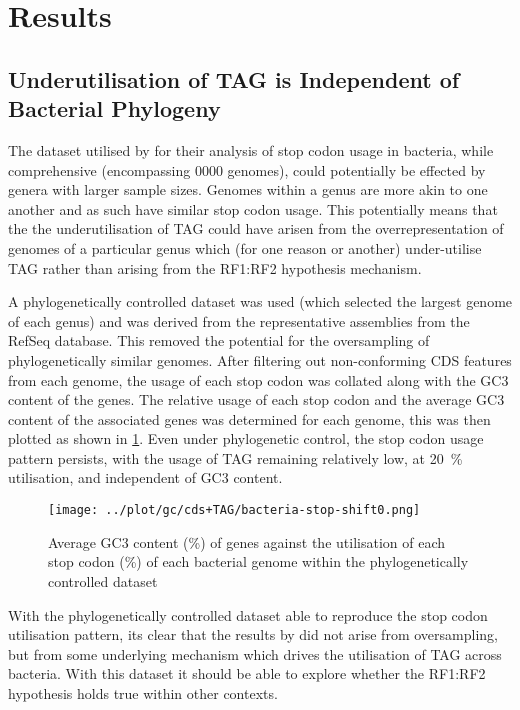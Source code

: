 \documentclass[../main.tex]{subfile}
\begin{document}
 \section{Results}
    \subsection{Underutilisation of TAG is Independent of Bacterial Phylogeny}
        The dataset utilised by \autocite{PLACEHOLDER} for their analysis of stop codon usage in bacteria, while comprehensive (encompassing \num{0000} genomes), could potentially be effected by genera with larger sample sizes. Genomes within a genus are more akin to one another and as such have similar stop codon usage. This potentially means that the the underutilisation of TAG could have arisen from the overrepresentation of genomes of a particular genus which (for one reason or another) under-utilise TAG rather than arising from the RF1:RF2 hypothesis mechanism.

        A phylogenetically controlled dataset was used (which selected the largest genome of each genus) and was  derived from the representative assemblies from the RefSeq database. This removed the potential for the oversampling of phylogenetically similar genomes. After filtering out non-conforming CDS features from each genome, the usage of each stop codon was collated along with the GC3 content of the genes. The relative usage of each stop codon and the average GC3 content of the associated genes was determined for each genome, this was then plotted as shown in \cref{fig:stopUsage/bacteria}. Even under phylogenetic control, the stop codon usage pattern persists, with the usage of TAG remaining relatively low, at \SI{20}{\percent} utilisation, and independent of GC3 content.

        \begin{figure}[H]
            \centering
            \texttt{[image: ../plot/gc/cds+TAG/bacteria-stop-shift0.png]}
            \caption{%
                Average GC3 content (\%) of genes against the utilisation of each stop codon (\%) of each bacterial genome within the phylogenetically controlled dataset
            }
            \label{fig:stopUsage/bacteria}
        \end{figure}

        With the phylogenetically controlled dataset able to reproduce the stop codon utilisation pattern, its clear that the results by \autocite{PLACEHOLDER} did not arise from oversampling, but from some underlying mechanism which drives the utilisation of TAG across bacteria. With this dataset it should be able to explore whether the RF1:RF2 hypothesis holds true within other contexts.
\end{document}
